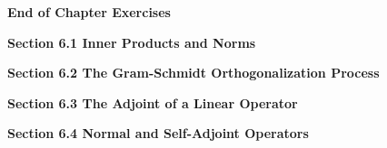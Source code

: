 \documentclass[11pt,largemargins]{homework}
\begin{document}
\maketitle

\textbf{\large{End of Chapter Exercises}}

\textbf{\large{Section 6.1} Inner Products and Norms}

\question

\question

\question

\question

\question

\question

\question

\question

\question

\question

\textbf{\large{Section 6.2} The Gram-Schmidt Orthogonalization Process}
\setcounter{questionCounter}{0}
\question

\question

\question

\question

\question

\question

\question

\question

\question

\question


\textbf{\large{Section 6.3} The Adjoint of a Linear Operator}
\setcounter{questionCounter}{0}
\question

\question

\question

\question

\question

\question

\question

\question

\question

\question

\textbf{\large{Section 6.4} Normal and Self-Adjoint Operators}
\setcounter{questionCounter}{0}
\question
\end{document}
